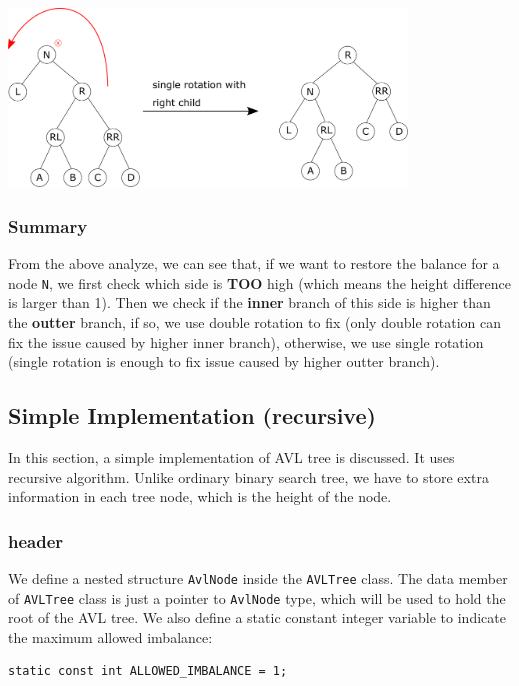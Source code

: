 \documentclass[12pt]{book}
\begin{document}
\begin{center}
\includegraphics[width=400px]{./img/AVL-deletion-RR-fix.pdf}
\end{center}
\subsubsection{Summary}
\label{sec:org16abe5c}
From the above analyze, we can see that, if we want to restore the balance for a node \texttt{N}, we first check which side is \textbf{TOO} high (which means the height difference is larger than 1). Then we check if the \textbf{inner} branch of this side is higher than the \textbf{outter} branch, if so, we use double rotation to fix (only double rotation can fix the issue caused by higher inner branch), otherwise, we use single rotation (single rotation is enough to fix issue caused by higher outter branch).

\subsection{Simple Implementation (recursive)}
\label{sec:org737dc02}
In this section, a simple implementation of AVL tree is discussed. It uses recursive algorithm. Unlike ordinary binary search tree, we have to store extra information in each tree node, which is the height of the node.

\subsubsection{header}
\label{sec:orgdb9b292}
We define a nested structure \texttt{AvlNode} inside the \texttt{AVLTree} class. The data member of \texttt{AVLTree} class is just a pointer to \texttt{AvlNode} type, which will be used to hold the root of the AVL tree. We also define a static constant integer variable to indicate the maximum allowed imbalance:
\begin{verbatim}
static const int ALLOWED_IMBALANCE = 1;
\end{verbatim}
\end{document}
